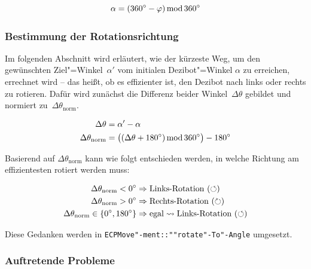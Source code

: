{\vspace{-1em}
\begin{equation*}
    \alpha = (360^\circ - \varphi) \operatorname{mod} 360^\circ
\end{equation*}


\subsubsection{Bestimmung der Rotationsrichtung}
\label{sec:rotation-direction-determination}

Im folgenden Abschnitt wird erläutert, wie der kürzeste Weg, um den gewünschten Ziel"=Winkel~$\alpha'$ vom initialen Dezibot"=Winkel $\alpha$ zu erreichen, errechnet wird -- das heißt, ob es effizienter ist, den Dezibot nach links oder rechts zu rotieren. Dafür wird zunächst die Differenz beider Winkel~$\Delta\theta$ gebildet und normiert zu~$\Delta\theta_{\text{norm}}$.

\vspace{-1em}
\begin{equation*}
\begin{aligned}
    \Delta\theta &= \alpha' - \alpha \\
    \Delta\theta_{\text{norm}} &= \big( (\Delta\theta + 180^\circ) \operatorname{mod} 360^\circ \big) - 180^\circ
\end{aligned}
\end{equation*}

Basierend auf $\Delta\theta_{\text{norm}}$ kann wie folgt entschieden werden, in welche Richtung am effizientesten rotiert werden muss:

\vspace{-1em}
\begin{equation*}
\begin{aligned}
    \Delta\theta_{\text{norm}} < 0^\circ &\Rightarrow \text{Links-Rotation} ~(\circlearrowleft)\\
    \Delta\theta_{\text{norm}} > 0^\circ &\Rightarrow \text{Rechts-Rotation} ~(\circlearrowright)\\
    \Delta\theta_{\text{norm}} \in \lbrace 0^\circ, 180^\circ \rbrace &\Rightarrow \text{egal} \leadsto \text{Links-Rotation} ~(\circlearrowleft)
\end{aligned}
\end{equation*}

Diese Gedanken werden in \texttt{ECPMove"-ment::""rotate"-To"-Angle} umgesetzt.


\subsubsection{Auftretende Probleme}

}
